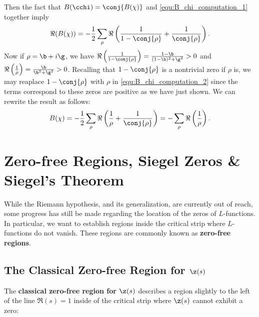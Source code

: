       Then the fact that $B(\cchi) = \conj{B(\chi)}$ and \cref{equ:B_chi_computation_1} together imply
      \begin{equation}\label{equ:B_chi_computation_2}
        \Re(B(\chi)) = -\frac{1}{2}\sum_{\rho}\Re\left(\frac{1}{1-\conj{\rho}}+\frac{1}{\conj{\rho}}\right).
      \end{equation}
      Now if $\rho = \b+i\g$, we have $\Re\left(\frac{1}{1-\conj{\rho}}\right) = \frac{1-\b}{(1-\b)^{2}+\g^{2}} > 0$ and $\Re\left(\frac{1}{\rho}\right) = \frac{\b}{\b^{2}+\g^{2}} > 0$. Recalling that $1-\conj{\rho}$ is a nontrivial zero if $\rho$ is, we may reaplace $1-\conj{\rho}$ with $\rho$ in \cref{equ:B_chi_computation_2} since the terms correspond to these zeros are positive as we have just shown. We can rewrite the result as follows:
      \begin{equation}\label{equ:B_chi_computation_3}
        B(\chi) = -\frac{1}{2}\sum_{\rho}\Re\left(\frac{1}{\rho}+\frac{1}{\conj{\rho}}\right) = -\sum_{\rho}\Re\left(\frac{1}{\rho}\right).
      \end{equation}
  \section{Zero-free Regions, Siegel Zeros \& Siegel's Theorem}
    While the Riemann hypothesis, and its generalization, are currently out of reach, some progress has still be made regarding the location of the zeros of $L$-functions. In particular, we want to establish regions inside the critical strip where $L$-functions do not vanish. These regions are commonly known as \textbf{zero-free regions}.
    \subsection*{The Classical Zero-free Region for \texorpdfstring{$\z(s)$}{\z(s)}}
      The \textbf{classical zero-free region for $\z(s)$} describes a region slightly to the left of the line $\Re(s) = 1$ inside of the critical strip where $\z(s)$ cannot exhibit a zero:

